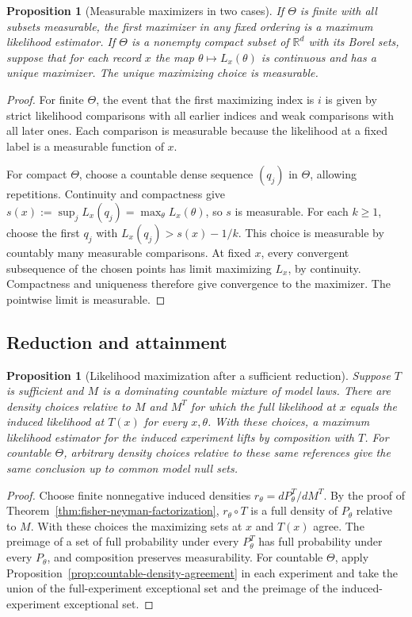 \documentclass[11pt,oneside]{book}
\newtheorem{proposition}[theorem]{Proposition}
\theoremstyle{definition}
\theoremstyle{remark}
\newcommand{\R}{\mathbb R}
\begin{document}
\begin{proposition}[Measurable maximizers in two cases]
\label{prop:ml-measurable-maximizers}
If $\Theta$ is finite with all subsets measurable, the first
maximizer in any fixed ordering is a maximum likelihood estimator.
If $\Theta$ is a nonempty compact subset of $\R^d$ with its Borel
sets, suppose that for each record $x$ the map $\theta\mapsto L_x(\theta)$
is continuous and has a unique maximizer. The unique maximizing
choice is measurable.
\end{proposition}
\begin{proof}
For finite $\Theta$, the event that the first maximizing index is $i$
is given by strict likelihood comparisons with all earlier indices and
weak comparisons with all later ones. Each comparison is measurable
because the likelihood at a fixed label is a measurable function of $x$.

For compact $\Theta$, choose a countable dense sequence $(q_j)$ in
$\Theta$, allowing repetitions. Continuity and compactness give
$s(x):=\sup_j L_x(q_j)=\max_\theta L_x(\theta)$, so $s$ is measurable.
For each $k\geq1$, choose the first $q_j$ with
$L_x(q_j)>s(x)-1/k$. This choice is measurable by countably many
measurable comparisons. At fixed $x$, every convergent subsequence
of the chosen points has limit maximizing $L_x$, by continuity.
Compactness and uniqueness therefore give convergence to the
maximizer. The pointwise limit is measurable.
\end{proof}

\subsection{Reduction and attainment}
\label{subsec:ml-reduction-attainment}

\begin{proposition}[Likelihood maximization after a sufficient reduction]
\label{prop:ml-sufficient-reduction}
Suppose $T$ is sufficient and $M$ is a dominating countable mixture
of model laws. There are density choices relative to $M$ and $M^T$
for which the full likelihood at $x$ equals the induced likelihood
at $T(x)$ for every $x,\theta$. With these choices, a maximum
likelihood estimator for the induced experiment lifts by composition
with $T$. For countable $\Theta$, arbitrary density choices relative
to these same references give the same conclusion up to common
model null sets.
\end{proposition}
\begin{proof}
Choose finite nonnegative induced densities
$r_\theta=dP_\theta^T/dM^T$. By the proof of
Theorem~\ref{thm:fisher-neyman-factorization}, $r_\theta\circ T$
is a full density of $P_\theta$ relative to $M$. With these choices
the maximizing sets at $x$ and $T(x)$ agree. The preimage of a set
of full probability under every $P_\theta^T$ has full probability
under every $P_\theta$, and composition preserves measurability.
For countable $\Theta$, apply
Proposition~\ref{prop:countable-density-agreement} in each
experiment and take the union of the full-experiment exceptional
set and the preimage of the induced-experiment exceptional set.
\end{proof}
\end{document}
